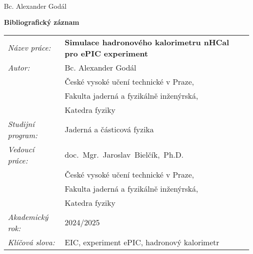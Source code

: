 \documentclass[a4paper, 12pt, oneside]{book}
\newcommand{\cvut}{České vysoké učení technické v Praze}
\newcommand{\fjfi}{Fakulta jaderná a fyzikálně inženýrská}
\newcommand{\kf}{Katedra fyziky}
\newcommand{\obor}{Jaderná a částicová fyzika}
\newcommand{\nazevcz}{Simulace hadronového kalorimetru nHCal pro ePIC experiment}
\newcommand{\klicovaslovacz}{EIC, experiment ePIC, hadronový kalorimetr}
\newcommand{\autor}{Bc. Alexander Godál}
\newcommand{\vedouci}{doc.~Mgr.~Jaroslav~Bielčík,~Ph.D.}
\newcommand{\konzultant}{Ing.~Alexandr~Prozorov,~Ph.D.}
\newcommand{\akrok}{2024/2025}
\begin{document}




%
%

%


\newpage
\thispagestyle{empty}


\vfill 
{}
\bigskip
\\
\indent %
\begin{flushright}
\autor
\end{flushright} 


\newpage
\thispagestyle{empty}

{\bf Bibliografický záznam}

\vspace{5mm} 

\begin{tabular}{p{100pt}l}
  {\em Název práce:} & {\bf \footnotesize\nazevcz} \\
  {\em Autor:} & \autor \\
   &\cvut, \\   
   &\fjfi,\\
   &\kf\\ 
  {\em Studijní program:} & \obor\\ 
  {\em Vedoucí práce:} & \vedouci \\ 
   &\cvut, \\   
   &\fjfi,\\
   &\kf\\
  {\em Akademický rok:} & \akrok\\
  {\em Klíčová slova:} & \klicovaslovacz\\
\end{tabular}
\end{document}
